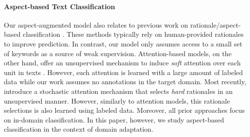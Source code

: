 \paragraph{Aspect-based Text Classification} Our aspect-augmented model also relates to previous work on rationale/aspect-based classification \cite{zaidan2007using,marshall2015robotreviewer,zhang2016rationale,brun-perez-roux:2016:SemEval}. These methods typically rely on human-provided rationales to improve prediction. In contrast, our model only assumes access to a small set of keywords as a source of weak supervision. Attention-based models, on the other hand, offer an unsupervised mechanism to induce \emph{soft} attention over each unit in texts \cite{bahdanau2014neural,rush2015neural,chen2015abc,cheng2016long,xu2015show,xu2015ask,yang2015stacked,martins2016softmax}. However, such attention is learned with a large amount of labeled data while our work assumes no annotations in the target domain. Most recently,  introduce a stochastic attention mechanism that selects \emph{hard} rationales in an unsupervised manner. However, similarly
to attention models, this rationale selections is also learned using labeled data. Moreover, all prior approaches focus on in-domain classification. In this paper, however, we study aspect-based classification in the context of domain adaptation. 


